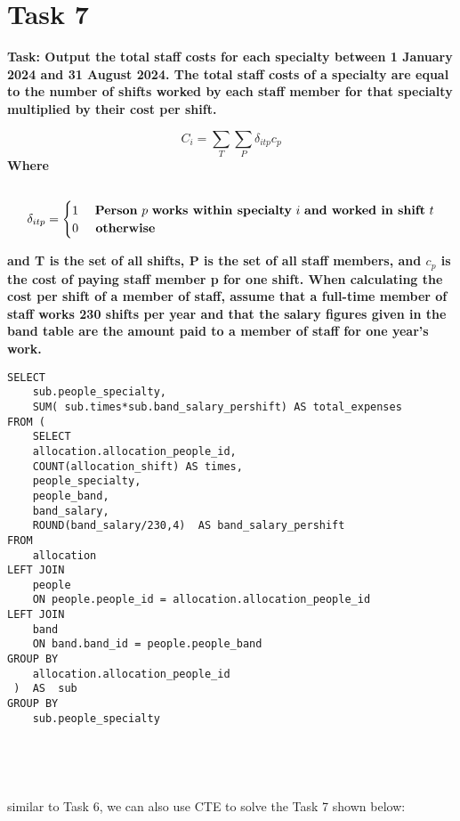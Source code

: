 \documentclass{article}
\begin{document}
\section{Task 7}

\textbf{Task: Output the total staff costs for each specialty between 1 January 2024 and 31 August
2024. The total staff costs of a specialty are equal to the number of shifts worked by
each staff member for that specialty multiplied by their cost per shift.}

\begin{equation}
C_i=\sum_T \sum_P \delta_{i t p} c_p
\end{equation}
\textbf{Where}
\begin{equation}
\begin{aligned}
&\text {  }\\
&\delta_{i t p}= \begin{cases}1 & \text { \textbf{Person} } p \text { \textbf{works within specialty} } i \text { \textbf{and worked in shift} } t \\ 0 & \textbf { otherwise }\end{cases}
\end{aligned}
\end{equation}

\textbf{and T is the set of all shifts, P is the set of all staff members, and $c_p$ is the cost of
paying staff member p for one shift. When calculating the cost per shift of a member
of staff, assume that a full-time member of staff works 230 shifts per year and that the
salary figures given in the band table are the amount paid to a member of staff for one
year’s work.}

\begin{lstlisting}[style=sqlstyle]
SELECT 
	sub.people_specialty,
    SUM( sub.times*sub.band_salary_pershift) AS total_expenses
FROM (
    SELECT 
    allocation.allocation_people_id,
    COUNT(allocation_shift) AS times,
    people_specialty,
    people_band,
    band_salary,
    ROUND(band_salary/230,4)  AS band_salary_pershift 
FROM 
    allocation
LEFT JOIN
    people
    ON people.people_id = allocation.allocation_people_id
LEFT JOIN
    band
    ON band.band_id = people.people_band
GROUP BY
    allocation.allocation_people_id
 )  AS  sub
GROUP BY 
    sub.people_specialty





\end{lstlisting}

similar to Task 6, we can also use CTE to solve the Task 7 shown below:
\end{document}
